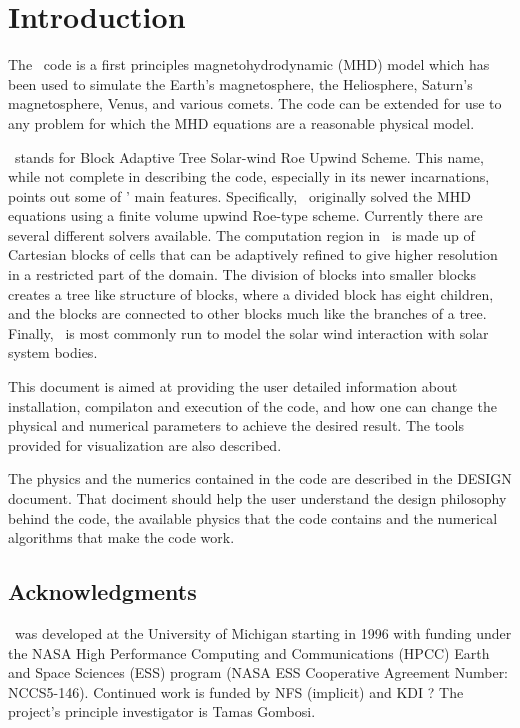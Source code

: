 \chapter{Introduction \label{chapter:introduction}}
The \BATSRUS\ code is a first principles magnetohydrodynamic (MHD)
model which has been used to simulate the Earth's magnetosphere, the
Heliosphere, Saturn's magnetosphere, Venus, and various comets.  The
code can be extended for use to any problem for which the MHD equations
are a reasonable physical model.

\BATSRUS\ stands for Block Adaptive Tree Solar-wind Roe Upwind Scheme.
This name, while not complete in describing the code, especially in its
newer incarnations, points out some of \BATSRUS' main features.  Specifically,
\BATSRUS\ originally solved the MHD equations using a finite volume upwind 
Roe-type scheme.
Currently there are several different solvers available.  The computation
region in \BATSRUS\ is made up of Cartesian blocks of cells that can be 
adaptively refined to give higher resolution in a restricted part of the 
domain.  The division of blocks into smaller blocks creates a tree like
structure of blocks, where a divided block has eight children, and the blocks
are connected to other blocks much like the branches of a tree.
Finally, \BATSRUS\ is most commonly run  to model the solar wind
interaction with solar system bodies.  

This document is aimed at providing the user detailed information about
installation, compilaton and execution of the code, and 
how one can change the physical and numerical parameters
to achieve the desired result. The tools provided for visualization
are also described.

The physics and the numerics contained in the code are described in
the DESIGN document. That dociment should help
the user understand the design philosophy behind the code, the 
available physics that the code contains and the numerical algorithms that
make the code work. 

\section{Acknowledgments}

\BATSRUS\ was developed at the University of Michigan starting in 1996
with funding under the NASA High Performance Computing and Communications (HPCC)
Earth and Space Sciences (ESS) program (NASA ESS Cooperative Agreement 
Number: NCCS5-146).  Continued work is funded by NFS (implicit) and KDI ?
The project's principle investigator is Tamas Gombosi.

